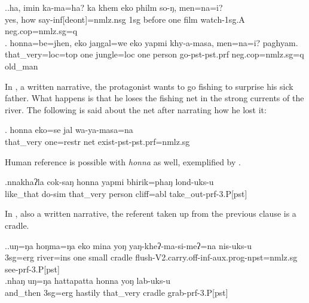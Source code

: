 \ex.\ag.ha,    imin ka-ma=ha? ka       khem    eko philm so-ŋ, men=na=i?\\
yes, how say{\sc -inf[deont]=nmlz.nsg}  {\sc 1sg} before one film watch{\sc [3.P;pst]-1sg.A} {\sc neg.cop=nmlz.sg=q}\\
\bg. honna=be=jhen,  eko jaŋgal=we    eko yapmi  khy-a-masa,    men=na=i?    paghyam.\\
that\_very{\sc =loc=top} one jungle{\sc =loc} one person go{\sc [3sg]-pst-pst.prf} {\sc neg.cop=nmlz.sg=q} old\_man \\
  

In \Next, a written narrative, the protagonist wants to go fishing to surprise his sick father. What happens is that he loses the fishing net in the strong currents of the river. The following is said about the net after narrating how he lost it:

\exg. honna           eko=se          jal wa-ya-masa=na\\
that\_very one{\sc =restr} net exist{\sc [3sg]-pst-pst.prf=nmlz.sg}\\
  

Human reference is possible with \emph{honna} as well, exemplified by \Next.
 
\exg.nnakhaʔla   cok-saŋ       honna    yapmi  bhirik=phaŋ   lond-uks-u\\
like\_that do{\sc -sim} that\_very  person cliff{\sc =abl} take\_out{\sc -prf-3.P[pst]}\\
 

In \Next, also a written narrative, the referent taken up from the previous clause is a cradle. 

\ex.\ag.uŋ=ŋa   hoŋma=ŋa   eko mina  yoŋ   yaŋ-kheʔ-ma-si-meʔ=na   nis-uks-u\\
{\sc 3sg=erg} river{\sc =ins} one small cradle flush{\sc -V2.carry.off-inf-aux.prog-npst=nmlz.sg} see{\sc -prf-3.P[pst]}\\
 
\bg.nhaŋ    uŋ=ŋa   hattapatta honna        yoŋ   lab-uks-u\\
and\_then {\sc 3sg=erg} hastily that\_very  cradle grab{\sc -prf-3.P[pst]}\\
 


